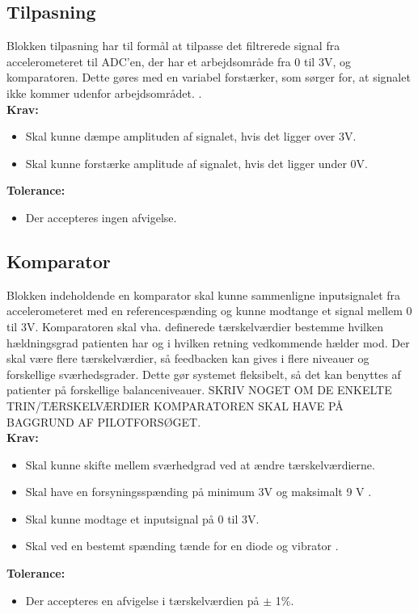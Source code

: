 \subsection{Tilpasning} 
Blokken tilpasning har til formål at tilpasse det filtrerede signal fra accelerometeret til ADC'en, der har et arbejdsområde fra 0 til 3V, og komparatoren. Dette gøres med en variabel forstærker, som sørger for, at signalet ikke kommer udenfor arbejdsområdet. . \\
\textbf{Krav:}
\begin{itemize}
\item Skal kunne dæmpe amplituden af signalet, hvis det ligger over 3V.
\item Skal kunne forstærke amplitude af signalet, hvis det ligger under 0V.
\end{itemize}
\textbf{Tolerance:}
\begin{itemize}
\item Der accepteres ingen afvigelse.
\end{itemize}
\subsection{Komparator} 
Blokken indeholdende en komparator skal kunne sammenligne inputsignalet fra accelerometeret med en referencespænding og kunne modtange et signal mellem 0 til 3V. Komparatoren skal vha. definerede tærskelværdier bestemme hvilken hældningsgrad patienten har og i hvilken retning vedkommende hælder mod. Der skal være flere tærskelværdier, så feedbacken kan gives i flere niveauer og forskellige sværhedsgrader. Dette gør systemet fleksibelt, så det kan benyttes af patienter på forskellige balanceniveauer.
SKRIV NOGET OM DE ENKELTE TRIN/TÆRSKELVÆRDIER KOMPARATOREN SKAL HAVE PÅ BAGGRUND AF PILOTFORSØGET. \\
\textbf{Krav:}
\begin{itemize}
\item Skal kunne skifte mellem sværhedgrad ved at ændre tærskelværdierne.
\item Skal have en forsyningsspænding på minimum 3V og maksimalt 9 V .
\item Skal kunne modtage et inputsignal på 0 til 3V.
\item Skal ved en bestemt spænding  tænde for en diode og vibrator .
\end{itemize}
\textbf{Tolerance:}
\begin{itemize}
\item Der accepteres en afvigelse i tærskelværdien på $\pm$ 1\%.
\end{itemize}
